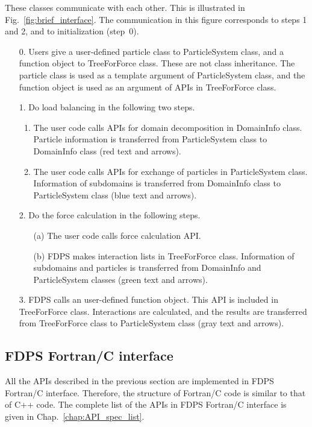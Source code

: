 These classes communicate with each other. This is illustrated in Fig.~\ref{fig:brief_interface}. The communication in this figure corresponds to steps 1 and 2, and to initialization (step~0).
\begin{enumerate}
\item[0.] Users give a user-defined particle class to ParticleSystem class, and a function object to TreeForForce class. These are not class inheritance. The particle class is used as a template argument of ParticleSystem class, and the function object is used as an argument of APIs in TreeForForce class.

\item[1.] Do load balancing in the following two steps.
\begin{enumerate}
\item The user code calls APIs for domain decomposition in DomainInfo class. Particle information is transferred from ParticleSystem class to DomainInfo class (red text and arrows).
\item The user code calls APIs for exchange of particles in ParticleSystem class. Information of subdomains is transferred from DomainInfo class to ParticleSystem class (blue text and arrows).
\end{enumerate}

\item[2.] Do the force calculation in the following steps.
\begin{enumerate}
\item[(a)] The user code calls force calculation API.

\item[(b)] FDPS makes interaction lists in TreeForForce
  class. Information of subdomains and particles is transferred from
  DomainInfo and ParticleSystem classes (green text and arrows).
\end{enumerate}

\item[3.] FDPS calls an user-defined function object. This API is included in TreeForForce class. Interactions are calculated, and the results are transferred from TreeForForce class to ParticleSystem class (gray text and arrows).
\end{enumerate}

\subsection{FDPS Fortran/C interface}
All the APIs described in the previous section are implemented in FDPS Fortran/C interface. Therefore, the structure of Fortran/C code is similar to that of C++ code. The complete list of the APIs in FDPS Fortran/C interface is given in Chap.~\ref{chap:API_spec_list}.

